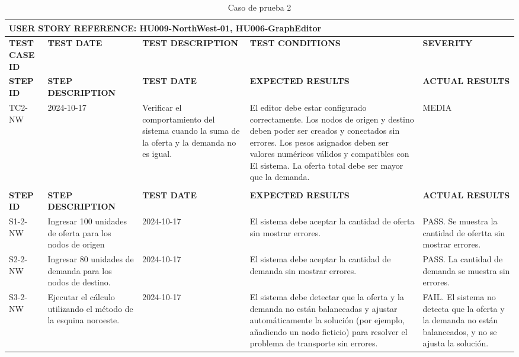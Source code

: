 \begin{longtable}{|p{2cm}|p{3cm}|p{3cm}|p{3cm}|p{3cm}|}
    \caption{Caso de prueba 2} \label{tab:casos_prueba2} \\
    \hline
    \multicolumn{5}{|l|}{\textbf{USER STORY REFERENCE: HU009-NorthWest-01, HU006-GraphEditor}} \\ \hline
    \textbf{TEST CASE ID} & \textbf{TEST DATE} & \textbf{TEST DESCRIPTION} & \textbf{TEST CONDITIONS} & \textbf{SEVERITY } \\ \hline
    \endfirsthead
    \hline
    \textbf{STEP ID} & \textbf{STEP DESCRIPTION} & \textbf{TEST DATE} & \textbf{EXPECTED RESULTS} & \textbf{ACTUAL RESULTS} \\ \hline
    \endhead
    TC2-NW & 2024-10-17 & Verificar el comportamiento del sistema cuando la suma de la oferta y la demanda no es igual. & El editor debe estar configurado correctamente. Los nodos de origen y destino deben poder ser creados y conectados sin errores. Los pesos asignados deben ser valores numéricos válidos y compatibles con El sistema. La oferta total debe ser mayor que  la demanda. & MEDIA                                                                                                     \\ \\ \hline
    \textbf{STEP ID} & \textbf{STEP DESCRIPTION} & \textbf{TEST DATE} & \textbf{EXPECTED RESULTS} & \textbf{ACTUAL RESULTS} \\ \hline
    S1-2-NW & Ingresar 100 unidades de oferta para los nodos de origen & 2024-10-17 & El sistema debe aceptar la cantidad de oferta sin mostrar errores. & PASS. Se muestra la cantidad de ofertta sin mostrar errores. \\ \hline
    S2-2-NW & Ingresar 80 unidades de demanda para los nodos de destino. & 2024-10-17 & El sistema debe aceptar la cantidad de demanda sin mostrar errores. & PASS. La cantidad de demanda se muestra sin errores. \\ \hline
    S3-2-NW & Ejecutar el cálculo utilizando el método de la esquina noroeste. & 2024-10-17 & El sistema debe detectar que la oferta y la demanda no están balanceadas y ajustar automáticamente la solución (por ejemplo, añadiendo un nodo ficticio) para resolver el problema de transporte sin errores. & FAIL. El sistema no detecta que la oferta y la demanda no están balanceados, y no se ajusta la solución. \\ \hline
\end{longtable}


